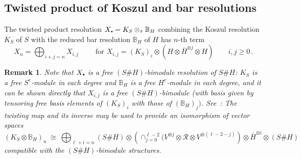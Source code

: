 \documentclass[11pt]{amsart}
\numberwithin{equation}{section}
\newtheorem{remark}[equation]{Remark}
\newcommand{\R}{\mathcal{R}}
\newcommand{\sd}{_{\DOT}}%
\newcommand{\BB}{\mathbb{B}} %
\newcommand{\DOT}{\setlength{\unitlength}{1.2pt}\begin{picture}(2.5,2)
               (1,1)\put(2.5,2.5){\circle*{2}}\end{picture}}
\renewcommand{\_}[1]{\mbox{$_{\left( #1 \right)}$}}
\newcommand{\ot}{\otimes}
\newcommand{\ott}{\otimes_{\tau}}
\newcommand{\Ho}{H}%
\begin{document}
{%
\subsection*{Twisted product of Koszul and bar resolutions}
The twisted product resolution
$X\sd=K_S\ott \BB_H$ 
combining the Koszul resolution $K_S$ of $S$ with the reduced
bar resolution $\BB_\Ho$ of $\Ho$
has $n$-th term
\begin{equation}\label{eqn:xij}
  X_n=\bigoplus_{i+j=n}X_{i,j}
  \qquad\text{ for } X_{i,j} = (K_S)_i\ot (\Ho\ot\bar{\Ho}^{\ot j}\ot \Ho) 
  \qquad i,j\geq 0\, . 
\end{equation}


\begin{remark}\label{LibertyOnX}
  {\em 
Note that $X\sd$ is a {\em free} $(S\# \Ho)$-bimodule resolution of $S\# \Ho$:
$K_S$ is a free $S^e$-module in each degree and $\BB_H$ is a free
$\Ho ^e$-module in each degree, and it can be shown directly that $X_{i,j}$
is a free $(S\# \Ho)$-bimodule 
(with basis given by tensoring free basis elements of $(K_S)_i$ with those
of $(\BB_H)_j)$.
See~\cite[Section 9]{TTP-AWEZ}:
The twisting map and its inverse may be used
to provide an isomorphism of vector spaces
\[
 (K_S\ot \BB_H)_n \ \cong \  \bigoplus_{\ell + i =n}
   (S\# H) \ot \left( \cap_{j=0}^{\ell -2}  (V^{\ot j}\ot \R\ot V^{\ot (\ell -2 -j)}
   \right) \ot \bar{H}^{\ot i}\ot (S\# H)
\]
compatible with the $(S\# H)$-bimodule structures.
}
\end{remark}

}
\end{document}
